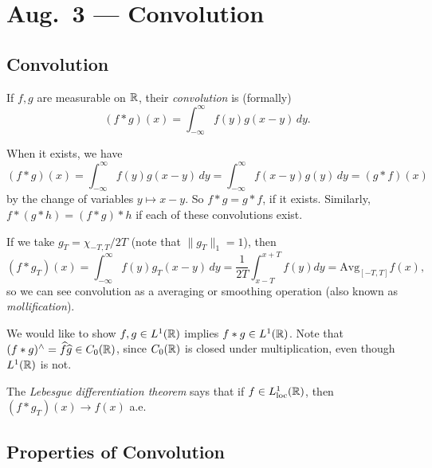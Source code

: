 \chapter{Aug.~3 --- Convolution}

\section{Convolution}

\begin{definition}
  If $f, g$ are measurable on $\mathbb{R}$, their
  \emph{convolution} is (formally)
  \[
    (f * g)(x)
    = \int_{-\infty}^\infty
    f(y) g(x - y)\, dy.
  \]
\end{definition}

\begin{remark}
  When it exists, we have
  \[
    (f * g)(x)
    = \int_{-\infty}^\infty
    f(y) g(x - y)\, dy
    = \int_{-\infty}^\infty
    f(x - y) g(y)\, dy
    = (g * f)(x)
  \]
  by the change of variables
  $y \mapsto x - y$. So
  $f * g = g * f$, if it exists. Similarly,
  $f * (g * h) = (f * g) * h$
  if each of these convolutions exist.
\end{remark}

\begin{remark}
  If we take $g_T = \chi_{-T, T} / 2T$
  (note that $\|g_T\|_1 = 1$),
  then
  \[
    (f * g_T)(x)
    = \int_{-\infty}^\infty
    f(y) g_T(x - y)\, dy
    = \frac{1}{2T} \int_{x - T}^{x + T} f(y) dy
    = \mathrm{Avg}_{[-T, T]} f(x),
  \]
  so we can see convolution as a
  averaging or smoothing operation
  (also known as \emph{mollification}).
\end{remark}

\begin{remark}
  We would like to show
  $f, g \in L^1(\mathbb{R})$ implies
  $f * g \in L^1(\mathbb{R})$. Note that
  $(f * g)^\wedge = \widehat{f} \widehat{g} \in C_0(\mathbb{R})$,
  since $C_0(\mathbb{R})$ is closed under
  multiplication, even though $L^1(\mathbb{R})$
  is not.
\end{remark}

\begin{remark}
  The \emph{Lebesgue differentiation theorem}
  says that if $f \in L^1_{\mathrm{loc}}(\mathbb{R})$, then
  $(f * g_T)(x) \to f(x)$ a.e.
\end{remark}

\section{Properties of Convolution}

